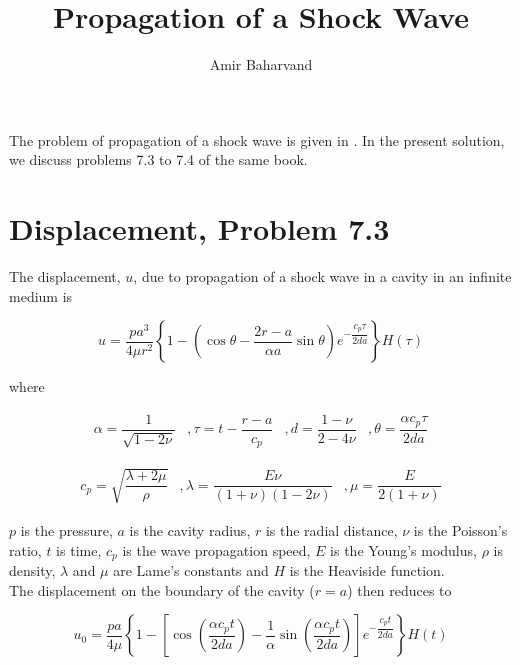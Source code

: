 \documentclass{article}
\title{Propagation of a Shock Wave}
\author{Amir Baharvand }
\date{}
\begin{document}
\maketitle

The problem of propagation of a shock wave is given in \cite{Verruijt2010}. In the present solution, we discuss problems 7.3 to 7.4 of the same book.

\section{Displacement, Problem 7.3}
The displacement, $u$, due to propagation of a shock wave in a cavity in an infinite medium is

\begin{equation}
    u = \frac{pa^3}{4\mu r^2} \left \{ 1 - \left( \cos\theta - \frac{2r - a}{\alpha a}  \sin\theta \right) e^{-\dfrac{c_p\tau}{2da}} \right \} H(\tau)
    \label{eq:u}
\end{equation}

where

\begin{equation*}
    \begin{matrix}
    \alpha = \dfrac{1}{\sqrt{1-2\nu}} & , 
    \tau = t - \dfrac{r-a}{c_p} & , 
    d = \dfrac{1-\nu}{2-4\nu} & ,
    \theta = \dfrac{\alpha c_p\tau}{2da}
    \end{matrix}
\end{equation*}

\begin{equation}
    \begin{matrix}
    c_p = \sqrt{\dfrac{\lambda + 2\mu}{\rho}} & , 
    \lambda = \dfrac{E \nu}{(1 + \nu)(1 - 2\nu)} & ,
    \mu = \dfrac{E}{2(1 + \nu)}
    \end{matrix}
    \label{eq:consts}
\end{equation}

$p$ is the pressure, $a$ is the cavity radius, $r$ is the radial distance, $\nu$ is the Poisson's ratio, $t$ is time, $c_p$ is the wave propagation speed, $E$ is the Young's modulus, $\rho$ is density, $\lambda$ and $\mu$ are Lame's constants and $H$ is the Heaviside function. \\

The displacement on the boundary of the cavity ($r=a$) then reduces to

\begin{equation}
    u_0 = \frac{pa}{4\mu} \left \{ 1 - \left[ \cos \left(\dfrac{\alpha c_p t}{2da} \right) - \frac{1}{\alpha}  \sin \left(\dfrac{\alpha c_pt}{2da} \right) \right] e^{-\dfrac{c_p t}{2da}} \right \} H(t)
    \label{eq:u_0}
\end{equation}
\end{document}
